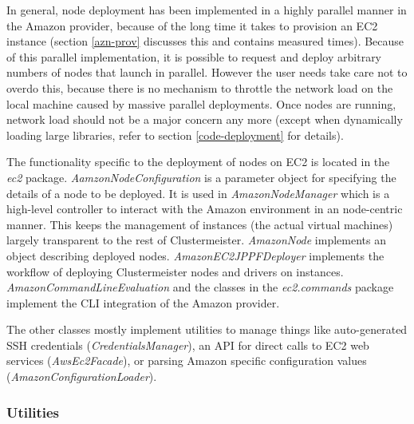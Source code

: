 \documentclass[english]{uzhpub}
\begin{document}
In general, node deployment has been implemented in a highly parallel manner in the Amazon provider, because of the long time it takes to provision an EC2 instance (section \ref{azn-prov} discusses this and contains measured times). Because of this parallel implementation, it is possible to request and deploy arbitrary numbers of nodes that launch in parallel. However the user needs take care not to overdo this, because there is no mechanism to throttle the network load on the local machine caused by massive parallel deployments. Once nodes are running, network load should not be a major concern any more (except when dynamically loading large libraries, refer to section \ref{code-deployment} for details).

The functionality specific to the deployment of nodes on EC2 is located in the \textit{ec2} package. \textit{AamzonNodeConfiguration} is a parameter object for specifying the details of a node to be deployed. It is used in \textit{AmazonNodeManager} which is a high-level controller to interact with the Amazon environment in an node-centric manner. This keeps the management of instances (the actual virtual machines) largely transparent to the rest of Clustermeister. \textit{AmazonNode} implements an object describing deployed nodes. \textit{AmazonEC2JPPFDeployer} implements the workflow of deploying Clustermeister nodes and drivers on instances. \textit{AmazonCommandLineEvaluation} and the classes in the \textit{ec2.commands} package implement the CLI integration of the Amazon provider.

The other classes mostly implement utilities to manage things like auto-generated SSH credentials (\textit{CredentialsManager}), an API for direct calls to EC2 web services (\textit{AwsEc2Facade}), or parsing Amazon specific configuration values (\textit{AmazonConfigurationLoader}).

\subsubsection{Utilities}
\end{document}
